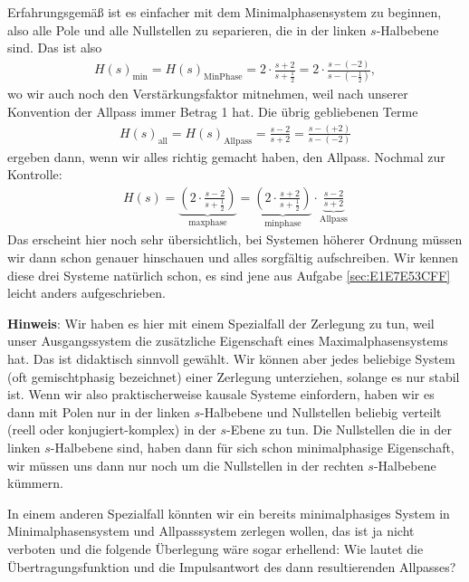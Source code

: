 \begin{ExCalc}
Erfahrungsgemäß ist es einfacher mit dem Minimalphasensystem zu beginnen, also
alle Pole und alle Nullstellen zu separieren, die in der linken $s$-Halbebene sind.
Das ist also
\begin{align}
H(s)_\mathrm{min}  = H(s)_\mathrm{Min Phase} = 2\cdot\frac{s+2}{s+\frac{1}{2}} = 2\cdot\frac{s-(-2)}{s-(-\frac{1}{2})},
\end{align}
wo wir auch noch den Verstärkungsfaktor mitnehmen, weil nach unserer Konvention
der Allpass immer Betrag 1 hat.
Die übrig gebliebenen Terme
\begin{align}
H(s)_\mathrm{all}  = H(s)_\mathrm{Allpass} =  \frac{s-2}{s+2} = \frac{s-(+2)}{s-(-2)}
\end{align}
ergeben dann, wenn wir alles richtig gemacht haben, den Allpass.
Nochmal zur Kontrolle:
\begin{align}
H(s) =
\underbrace{\left(2\cdot\frac{s-2}{s+\frac{1}{2}}\right)}_{\mathrm{max phase}} =
\underbrace{\left(2\cdot\frac{s+2}{s+\frac{1}{2}}\right)}_{\mathrm{min phase}}
\cdot \underbrace{\frac{s-2}{s+2}}_{\mathrm{Allpass}}
\end{align}
Das erscheint hier noch sehr übersichtlich, bei Systemen höherer Ordnung
müssen wir dann schon genauer hinschauen und alles sorgfältig aufschreiben.
%
Wir kennen diese drei Systeme natürlich schon, es sind jene aus Aufgabe \ref{sec:E1E7E53CFF}
leicht anders aufgeschrieben.

\textbf{Hinweis}: Wir haben es hier mit einem Spezialfall der Zerlegung zu tun,
weil unser Ausgangssystem die zusätzliche Eigenschaft eines Maximalphasensystems
hat. Das ist didaktisch sinnvoll gewählt.
Wir können aber jedes beliebige System (oft gemischtphasig bezeichnet) einer
Zerlegung unterziehen, solange es nur stabil ist. Wenn wir also praktischerweise
kausale Systeme einfordern, haben wir es dann mit Polen nur in der linken $s$-Halbebene
und Nullstellen beliebig verteilt (reell oder konjugiert-komplex)
in der $s$-Ebene zu tun.
Die Nullstellen die in der linken $s$-Halbebene sind, haben
dann für sich schon minimalphasige Eigenschaft, wir müssen uns dann nur noch
um die Nullstellen in der rechten $s$-Halbebene kümmern.

In einem anderen Spezialfall
könnten wir ein bereits minimalphasiges System in Minimalphasensystem und
Allpasssystem zerlegen wollen, das ist ja nicht verboten und die folgende Überlegung
wäre sogar erhellend: Wie lautet die Übertragungsfunktion und die Impulsantwort
des dann resultierenden Allpasses?

\end{ExCalc}

